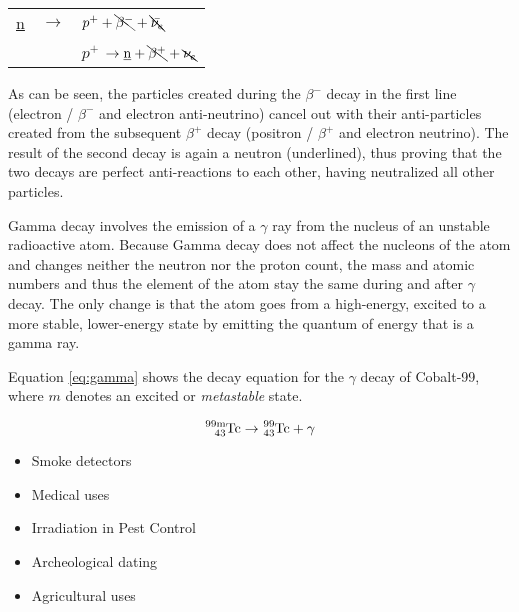 \begin{table}[h!]
\centering
  \begin{tabular}{l l l}
    \underline{n} & $\to$ & $p^+ + \bcancel{\beta^-} + \bcancel{\bar{\nu_{e}}}$
    \\
    && $p^+$ $\to  \text{\underline{n}} + \bcancel{\beta^+} + \bcancel{\nu_{e}}$
  \end{tabular}
\end{table}

As can be seen, the particles created during the $\beta^-$ decay in the first line (electron / $\beta^-$ and electron anti-neutrino) cancel out with their anti-particles created from the subsequent $\beta^+$ decay (positron / $\beta^+$ and electron neutrino). The result of the second decay is again a neutron (underlined), thus proving that the two decays are perfect anti-reactions to each other, having neutralized all other particles.


Gamma decay involves the emission of a $\gamma$ ray from the nucleus of an unstable radioactive atom. Because Gamma decay does not affect the nucleons of the atom and changes neither the neutron nor the proton count, the mass and atomic numbers and thus the element of the atom stay the same during and after $\gamma$ decay. The only change is that the atom goes from a high-energy, excited to a more stable, lower-energy state by emitting the quantum of energy that is a gamma ray. 

Equation \ref{eq:gamma} shows the decay equation for the $\gamma$ decay of Cobalt-99, where $m$ denotes an excited or \emph{metastable} state.

\begin{equation}
  \ce{^{99m}_{43}Tc} \rightarrow \ce{^{99}_{43}Tc} + \gamma
  \label{eq:gamma}
\end{equation}

\pagebreak


\begin{itemize}
  \item Smoke detectors
  \item Medical uses
  \item Irradiation in Pest Control
  \item Archeological dating
  \item Agricultural uses
\end{itemize}

